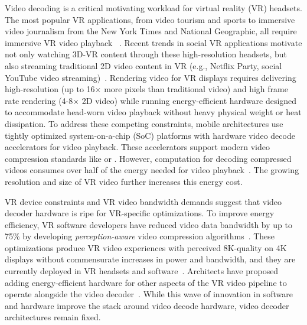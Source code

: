 
Video decoding is a critical motivating workload for virtual reality (VR) headsets.
The most popular VR applications, from \threesixty video tourism and sports to immersive video journalism from the New York Times and National Geographic, all require immersive VR video playback ~\cite{nytvr,nationalgeographic-vr}.
Recent trends in social VR applications motivate not only watching 3D-\threesixty VR content through these high-resolution headsets, but also streaming traditional 2D video content in VR (e.g., Netflix Party, social YouTube video streaming)~\cite{netflixparty}.
Rendering video for VR displays requires delivering high-resolution (up to 16$\times$ more pixels than traditional video) and high frame rate rendering (4-8$\times$ 2D video) while running energy-efficient hardware designed to accommodate head-worn video playback without heavy physical weight or heat dissipation.
To address these competing constraints, mobile architectures use tightly optimized system-on-a-chip (SoC) platforms with hardware video decode accelerators for video playback.
These accelerators support modern video compression standards like \hevc or \vpnine.
However, computation for decoding compressed videos consumes over half of the energy needed for video playback~\cite{google2018asplos,hevcThesis}.
The growing resolution and size of VR video further increases this energy cost.

\foveatedExampleFigure

VR device constraints and VR video bandwidth demands suggest that video decoder hardware is ripe for VR-specific optimizations.
To improve energy efficiency, VR software developers have reduced video data bandwidth by up to 75\% by developing \emph{perception-aware} video compression algorithms~\cite{guenter2012foveated,patney2017perceptual, visualcloud2017haynes,rubiks,fov-cloud-ryoo}.
These optimizations produce VR video experiences with perceived 8K-quality on 4K displays without commensurate increases in power and bandwidth, and they are currently deployed in VR headsets and software~\cite{htc-vive-pro-eye, patney2017perceptual, kaplanyan2019deepfovea}.
Architects have proposed adding energy-efficient hardware for other aspects of the VR video pipeline to operate alongside the video decoder~\cite{evr19isca, leng2018semantic, xie2018perception, zhang2017race}.
While this wave of innovation in software and hardware improve the stack around video decode hardware, video decoder architectures remain fixed.

